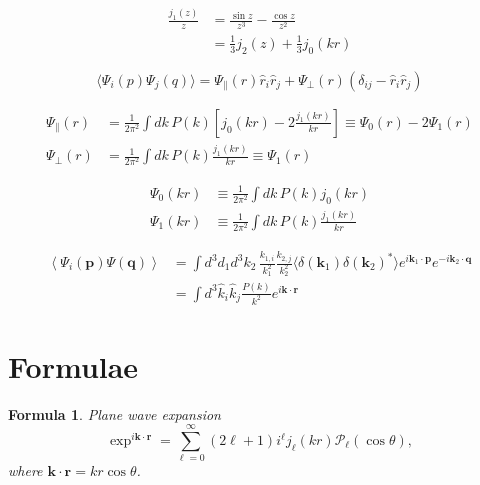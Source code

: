 \documentclass[a4paper,11pt]{article}
\newtheorem{formula}{Formula}[section]
\begin{document}
\begin{equation}
  \begin{split}
    \frac{j_1(z)}{z} &= \frac{\sin z}{z^3} - \frac{\cos z}{z^2} \\
    &= \frac{1}{3} j_2(z) + \frac{1}{3} j_0(kr)
  \end{split}
\end{equation}

\begin{equation}
  \langle \Psi_i(p) \Psi_j(q) \rangle
  = \Psi_\parallel(r) \hat{r}_i \hat{r}_j
  + \Psi_\perp(r) (\delta_{ij} - \hat{r}_i \hat{r}_j)
\end{equation}

\begin{align}
  \Psi_\parallel(r) &= \frac{1}{2\pi^2} \int \! dk \, P(k)
  \left[j_0(kr) - 2 \frac{j_1(kr)}{kr} \right] \equiv \Psi_0(r) - 2 \Psi_1(r)\\
  \Psi_\perp(r) &= \frac{1}{2\pi^2} \int \! dk \, P(k)
  \frac{j_1(kr)}{kr} \equiv \Psi_1(r)
\end{align}

\begin{align}
  \Psi_0(kr) &\equiv \frac{1}{2\pi^2} \int \! dk \, P(k) j_0(kr) \\
  \Psi_1(kr) &\equiv \frac{1}{2\pi^2} \int \! dk \, P(k) \frac{j_1(kr)}{kr}
\end{align}

\begin{align}
  \left\langle \Psi_i(\bm{p}) \Psi(\bm{q}) \right\rangle
  &= \int d^3 d_1 d^3 k_2 \, \frac{k_{1, i}}{k_1^2} \frac{k_{2,j}}{k_2^2}
     \langle \delta(\bm{k}_1) \delta(\bm{k}_2)^* \rangle e^{i\bm{k}_1 \cdot \bm{p}}
     e^{-i\bm{k}_2 \cdot \bm{q}}\\
  &= \int \! d^3 \hat{k}_i \hat{k}_j \frac{P(k)}{k^2} e^{i\bm{k}\cdot \bm{r}} 
\end{align}

\appendix

\section{Formulae}

\begin{formula}
  Plane wave expansion
  \begin{equation}
    \exp^{i\bm{k} \cdot \bm{r}} = \sum_{\ell=0}^\infty (2 \ell + 1) i^\ell j_\ell(kr) \mathcal{P}_\ell (\cos \theta),
  \end{equation}
where $\bm{k} \cdot \bm{r} = k r \cos\theta$.
\end{formula}
\end{document}
